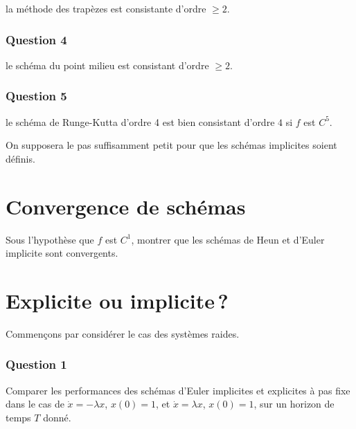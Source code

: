 
la méthode des trapèzes est consistante d'ordre \(\geq 2\).

\hypertarget{ed2-consist-4}{%
\subsubsection*{Question 4}\label{ed2-consist-4}}


le schéma du point milieu est consistant d'ordre \(\geq 2\).

\hypertarget{ed2-consist-5}{%
\subsubsection*{Question 5}\label{ed2-consist-5}}


le schéma de Runge-Kutta d'ordre 4 est bien consistant d'ordre \(4\) si
\(f\) est \(C^5\).

On supposera le pas suffisamment petit pour que les schémas implicites
soient définis.

\hypertarget{ed2-conv}{%
\section{Convergence de schémas}\label{ed2-conv}}

Sous l'hypothèse que \(f\) est \(C^1\), montrer que les schémas de Heun
et d'Euler implicite sont convergents.

\hypertarget{ed2-exo_exp_impl}{%
\section{Explicite ou implicite\,?}\label{ed2-exo_exp_impl}}

Commençons par consid\'erer le cas des syst\`emes raides.

\hypertarget{ed2-impl-1}{%
\subsubsection*{Question 1}\label{ed2-impl-1}}


Comparer les performances des schémas d'Euler implicites et explicites à
pas fixe dans le cas de \(\dot{x} = -\lambda x\), \(x(0)=1\), et
\(\dot{x} = \lambda x\), \(x(0)=1\), sur un horizon de temps \(T\)
donné.

